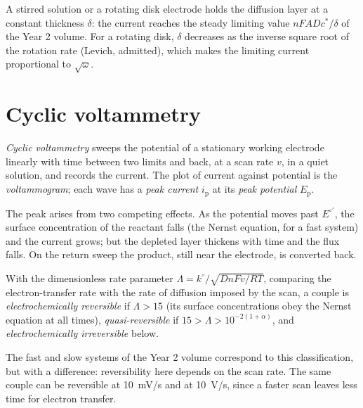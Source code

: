 A stirred solution or a rotating disk electrode holds the diffusion layer at a
constant thickness $\delta$: the current reaches the steady limiting value $nFADc^*/\delta$
of the Year 2 volume. For a rotating disk, $\delta$ decreases as the inverse square
root of the rotation rate (Levich, admitted), which makes the limiting current
proportional to $\sqrt\omega$.

\section{Cyclic voltammetry}

\begin{definition}\label{def:b3:electrode-kinetics:cv}
\emph{Cyclic voltammetry} sweeps the potential of a
stationary working electrode linearly with time between two limits and back, at
a scan rate $v$, in a quiet solution, and records the current. The plot of current
against potential is the \emph{voltammogram}; each wave has a
\emph{peak current} $i_{\mathrm p}$ at its \emph{peak potential} $E_{\mathrm p}$.
\end{definition}

The peak arises from two competing effects. As the potential moves past $E^{\circ\prime}$, the
surface concentration of the reactant falls (the Nernst equation, for a fast
system) and the current grows; but the depleted layer thickens with time and
the flux falls. On the return sweep the product, still near the electrode, is
converted back.

\begin{definition}[Reversibility]\label{def:b3:electrode-kinetics:reversibility}
With the dimensionless rate parameter $\Lambda = k^\circ/\sqrt{DnFv/RT}$, comparing the
electron-transfer rate with the rate of diffusion imposed by the scan, a
couple is \emph{electrochemically reversible} if $\Lambda > 15$ (its surface concentrations obey the Nernst equation
at all times), \emph{quasi-reversible} if $15 >
\Lambda > 10^{-2(1 + \alpha)}$, and \emph{electrochemically irreversible} below.
\end{definition}

\begin{remark}
The fast and slow systems of the Year 2 volume correspond to this
classification, but with a difference: reversibility here depends on the scan
rate. The same couple can be reversible at \qty{10}{mV/s} and  at
\qty{10}{V/s}, since a faster scan leaves less time for electron transfer.
\end{remark}


